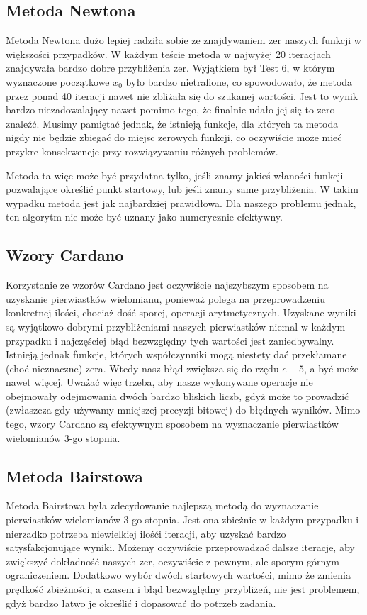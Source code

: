 \documentclass[a4paper]{article}
\begin{document}
    \subsection{Metoda Newtona}
        Metoda Newtona dużo lepiej radziła sobie ze znajdywaniem zer naszych funkcji w większości przypadków.
        W każdym teście metoda w najwyżej 20 iteracjach znajdywała bardzo dobre przybliżenia zer. Wyjątkiem był Test 6,
        w którym wyznaczone początkowe $x_0$ było bardzo nietrafione, co spowodowało, że metoda przez ponad 40 iteracji nawet
        nie zbliżała się do szukanej wartości. Jest to wynik bardzo niezadowalający nawet pomimo tego, że finalnie udało
        jej się to zero znaleźć. Musimy pamiętać jednak, że istnieją funkcje, dla których ta metoda nigdy nie będzie 
        zbiegać do miejsc zerowych funkcji, co oczywiście może mieć przykre konsekwencje przy rozwiązywaniu różnych problemów.
        
        Metoda ta więc może być przydatna tylko, jeśli znamy jakieś właności funkcji pozwalające określić punkt startowy,
        lub jeśli znamy same przybliżenia. W takim wypadku metoda jest jak najbardziej prawidłowa. Dla naszego problemu
        jednak, ten algorytm nie może być uznany jako numerycznie efektywny.
    \subsection{Wzory Cardano}
        Korzystanie ze wzorów Cardano jest oczywiście najszybszym sposobem na uzyskanie pierwiastków wielomianu, ponieważ
        polega na przeprowadzeniu konkretnej ilości, chociaż dość sporej, operacji arytmetycznych. Uzyskane wyniki są
        wyjątkowo dobrymi przybliżeniami naszych pierwiastków niemal w każdym przypadku i najczęściej błąd bezwzględny
        tych wartości jest zaniedbywalny. Istnieją jednak funkcje, których współczynniki mogą niestety dać przekłamane
        (choć nieznaczne) zera. Wtedy nasz błąd zwiększa się do rzędu $e-5$, a być może nawet więcej. Uważać więc trzeba,
        aby nasze wykonywane operacje nie obejmowały odejmowania dwóch bardzo bliskich liczb, gdyż może to prowadzić
        (zwłaszcza gdy używamy mniejszej precyzji bitowej) do błędnych wyników. Mimo tego, wzory Cardano są efektywnym
        sposobem na wyznaczanie pierwiastków wielomianów 3-go stopnia.
    \subsection{Metoda Bairstowa}
        Metoda Bairstowa była zdecydowanie najlepszą metodą do wyznaczanie pierwiastków wielomianów 3-go stopnia. Jest
        ona zbieżnie w każdym przypadku i nierzadko potrzeba niewielkiej ilośći iteracji, aby uzyskać bardzo satysfakcjonujące
        wyniki. Możemy oczywiście przeprowadzać dalsze iteracje, aby zwiększyć dokładność naszych zer, oczywiście z pewnym, ale sporym
        górnym ograniczeniem. Dodatkowo wybór dwóch startowych wartości, mimo że zmienia prędkość zbieżności, a czasem i błąd bezwzględny
        przybliżeń, nie jest problemem, gdyż bardzo łatwo je określić i dopasować do potrzeb zadania.
\end{document}
